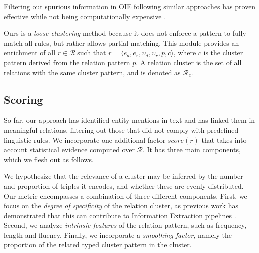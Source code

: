 Filtering out spurious information in OIE following similar approaches has proven effective while not being computationally expensive \citep{Fader2011}.

Ours is a \textit{loose clustering} method because it does not enforce a pattern to fully match all rules, but rather allows partial matching. This module provides an enrichment of all $r \in \mathcal{R}$ such that $r = \langle e_d, e_r, \upsilon_d, \upsilon_r, p, c\rangle$, where $c$ is the cluster pattern derived from the relation pattern $p$. A relation cluster is the set of all relations with the same cluster pattern, and is denoted as $\mathcal{R}_c$. 


\subsection{Scoring}
\label{sec:kb:method:scoring}

So far, our approach has identified entity mentions in text and has linked them in meaningful relations, filtering out those that did not comply with predefined linguistic rules. We incorporate one additional factor $score(r)$ that takes into account statistical evidence computed over $\mathcal{R}$. It has three main components, which we flesh out as follows.

We hypothesize that the relevance of a cluster may be inferred by the number and proportion of triples it encodes, and whether these are evenly distributed. 
Our metric encompasses a combination of three different components. First, we focus on the \textit{degree of specificity} of the relation cluster, as previous work has demonstrated that this can contribute to Information Extraction pipelines \citep{DelliBovietal2015}. Second, we analyze \textit{intrinsic features} of the relation pattern, such as frequency, length and fluency. Finally, we incorporate a \textit{smoothing factor}, namely the proportion of the related typed cluster pattern in the cluster.

